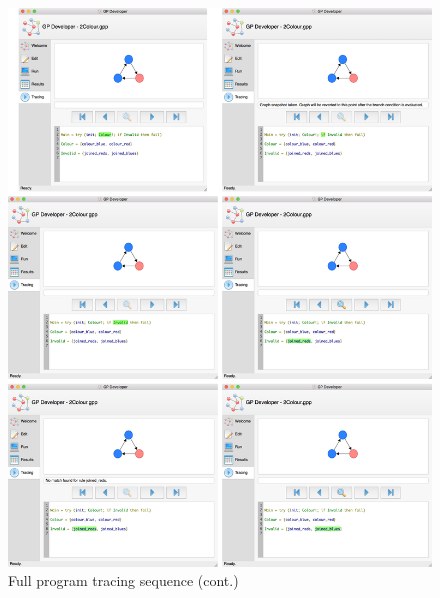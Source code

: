 \documentclass[authoryearcitations]{UoYCSproject}
\newenvironment{nscenter}
    {\parskip=0pt\par\nopagebreak\centering}
    {\par\noindent\ignorespacesafterend}
\begin{document}
\begin{appendices}
\begin{figure}[!htb]
    \ContinuedFloat
    \begin{nscenter}
        \includegraphics[width=\textwidth]{SeqCollage3}
    \end{nscenter}
    \caption{Full program tracing sequence (cont.)}
    \label{fig:TracingSequence}
\end{figure}


\end{appendices}
\end{document}
